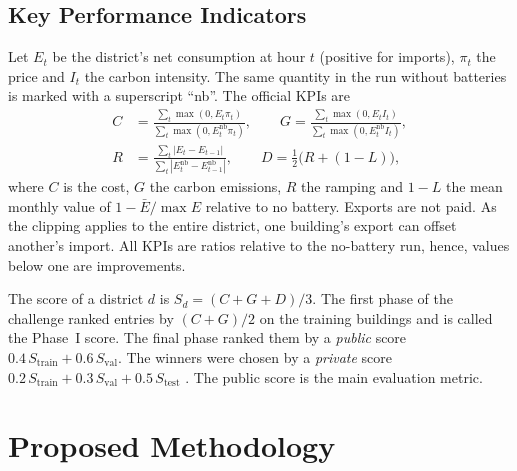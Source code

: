 \documentclass[conference]{IEEEtran}
\begin{document}
\subsection{Key Performance Indicators}
Let $E_t$ be the district's net consumption at hour $t$ (positive for imports), $\pi_t$ the price and $I_t$ the carbon
intensity. The same quantity in the run without batteries is marked with a superscript ``nb''. The official KPIs are
\begin{align}
  C &= \frac{\sum_t \max(0, E_t \pi_t)}{\sum_t \max(0, E_t^{\mathrm{nb}} \pi_t)}, \qquad
  G = \frac{\sum_t \max(0, E_t I_t)}{\sum_t \max(0, E_t^{\mathrm{nb}} I_t)}, \\
  R &= \frac{\sum_t |E_t - E_{t-1}|}{\sum_t |E_t^{\mathrm{nb}} - E_{t-1}^{\mathrm{nb}}|}, \qquad
  D = \tfrac{1}{2}\bigl(R + (1-L)\bigr),
\end{align}
where $C$ is the cost, $G$ the carbon emissions, $R$ the ramping and $1-L$ the mean monthly value of $1 - \bar E / \max E$
relative to no battery. Exports are not paid. As the clipping applies to the entire district, one building's export can
offset another's import. All KPIs are ratios relative to the no-battery run, hence, values below one are improvements.

The score of a district $d$ is $S_d=(C+G+D)/3$. The first phase of the challenge ranked entries by $(C+G)/2$ on the
training buildings and is called the Phase~I score. The final phase ranked them by a \emph{public} score
$0.4\,S_\mathrm{train} + 0.6\,S_\mathrm{val}$. The winners were chosen by a \emph{private} score
$0.2\,S_\mathrm{train} + 0.3\,S_\mathrm{val} + 0.5\,S_\mathrm{test}$ \cite{nweye2023challenge}. The public score is the main evaluation metric.

\section{Proposed Methodology}\label{sec:method}
\end{document}
